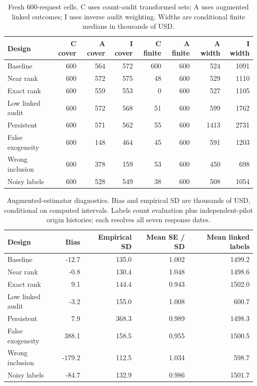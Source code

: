 \begin{table}[htbp]\centering\small
\caption{Fresh 600-request cells. C uses count-audit transformed sets; A uses augmented linked outcomes; I uses inverse audit weighting. Widths are conditional finite medians in thousands of USD.}
\begin{tabular}{lrrrrrrr}\toprule
Design & C cover & A cover & I cover & C finite & A finite & A width & I width\\\midrule
Baseline & 600 & 564 & 572 & 600 & 600 & 524 & 1091\\
Near rank & 600 & 572 & 575 & 48 & 600 & 529 & 1110\\
Exact rank & 600 & 559 & 553 & 0 & 600 & 527 & 1105\\
Low linked audit & 600 & 572 & 568 & 51 & 600 & 599 & 1762\\
Persistent & 600 & 571 & 562 & 55 & 600 & 1413 & 2731\\
False exogeneity & 600 & 148 & 464 & 45 & 600 & 591 & 1203\\
Wrong inclusion & 600 & 378 & 159 & 53 & 600 & 450 & 698\\
Noisy labels & 600 & 528 & 549 & 38 & 600 & 508 & 1054\\
\bottomrule\end{tabular}\label{tab:coverage}\end{table}
\begin{table}[htbp]\centering\small
\caption{Augmented-estimator diagnostics. Bias and empirical SD are thousands of USD, conditional on computed intervals. Labels count evaluation plus independent-pilot origin histories; each resolves all seven response dates.}
\begin{tabular}{lrrrr}\toprule
Design & Bias & Empirical SD & Mean SE / SD & Mean linked labels\\\midrule
Baseline & -12.7 & 135.0 & 1.002 & 1499.2\\
Near rank & -0.8 & 130.4 & 1.048 & 1498.6\\
Exact rank & 9.1 & 144.4 & 0.943 & 1502.0\\
Low linked audit & -3.2 & 155.0 & 1.008 & 600.7\\
Persistent & 7.9 & 368.3 & 0.989 & 1498.3\\
False exogeneity & 388.1 & 158.5 & 0.955 & 1500.5\\
Wrong inclusion & -179.2 & 112.5 & 1.034 & 598.7\\
Noisy labels & -84.7 & 132.9 & 0.986 & 1501.7\\
\bottomrule\end{tabular}\label{tab:diagnostics}\end{table}
